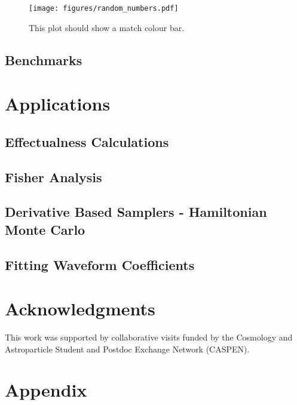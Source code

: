 \documentclass[twocolumn]{aastex631}
\begin{document}
\begin{figure}[ht!]
    \begin{centering}
        \texttt{[image: figures/random\_numbers.pdf]}
        \caption{
            This plot should show a match colour bar.
        }
        \label{fig:random_numbers}
    \end{centering}
\end{figure}


\subsection{Benchmarks}
\label{subsec:benchmarks}

\section{Applications}
\label{sec:applications}

\subsection{Effectualness Calculations}
\label{sec:effectualness}

\subsection{Fisher Analysis}
\label{subsec:fisher}

\subsection{Derivative Based Samplers - Hamiltonian Monte Carlo}
\label{subsec:hmc}

\subsection{Fitting Waveform Coefficients}
\label{subsec:hmc}

\section{Acknowledgments}
This work was supported by collaborative visits funded by the Cosmology and Astroparticle Student and Postdoc Exchange Network (CASPEN).



\section{Appendix}
\label{sec:appendix}
\end{document}
